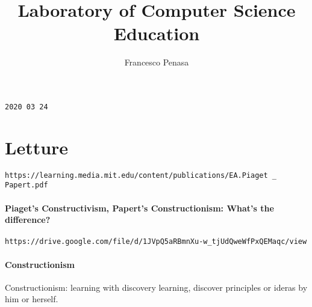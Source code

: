 \documentclass[11pt]{article}
\begin{document}
\author{Francesco Penasa}
\title{Laboratory of Computer Science Education}
\maketitle

\medskip

\texttt{2020 03 24}

\section{Letture} %
\label{sec:letture}
\texttt{https://learning.media.mit.edu/content/publications/EA.Piaget \_ Papert.pdf}
\paragraph{Piaget’s Constructivism, Papert’s Constructionism: What’s the difference?} %
\label{par:Constructivism}


\texttt{https://drive.google.com/file/d/1JVpQ5aRBmnXu-w\_tjUdQweWfPxQEMaqc/view}
\paragraph{Constructionism} %
\label{par:Constructionism}
Constructionism: learning with discovery learning, discover principles or ideras by him or herself.

\end{document}
